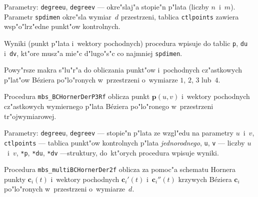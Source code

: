 Parametry: \texttt{degreeu}, \texttt{degreev} --- okre"slaj"a stopie"n
p"lata (liczby $n$~i~$m$). Parametr \texttt{spdimen} okre"sla wymiar~$d$
przestrzeni, tablica \texttt{ctlpoints} zawiera wsp"o"lrz"edne punkt"ow
kontrolnych.

Wyniki (punkt p"lata i~wektory pochodnych) procedura wpisuje do tablic
\texttt{p}, \texttt{du} i~\texttt{dv}, kt"ore musz"a mie"c d"lugo"s"c co
najmniej \texttt{spdimen}.

\vspace{\bigskipamount}
Powy"rsze makra s"lu"r"a do obliczania punkt"ow i~pochodnych cz"astkowych
p"lat"ow B\'{e}ziera po"lo"ronych w~przestrzeni o~wymiarze $1$, $2$, $3$
lub~$4$.

\vspace{\bigskipamount}
Procedura \texttt{mbs\_BCHornerDerP3Rf} oblicza punkt $\bm{p}(u,v)$
i~wektory pochodnych cz"astkowych wymiernego p"lata B\'{e}ziera po"lo"ronego
w~przestrzeni tr"ojwymiarowej.

Parametry: \texttt{degreeu}, \texttt{degreev} --- stopie"n p"lata ze
wzgl"edu na parametry $u$~i~$v$, \texttt{ctlpoints} --- tablica punkt"ow
kontrolnych p"lata \emph{jednorodnego}, \texttt{u}, \texttt{v} --- liczby
$u$~i~$v$, \texttt{*p}, \texttt{*du}, \texttt{*dv} ---struktury, do~kt"orych
procedura wpisuje wyniki.

\vspace{\bigskipamount}
\begin{sloppypar}
Procedura \texttt{mbs\_multiBCHornerDer2f} oblicza za pomoc"a schematu
Hornera punk\-ty $\bm{c}_i(t)$ i~wektory pochodnych $\bm{c}_i'(t)$
i~$\bm{c}_i''(t)$ krzywych
B\'{e}ziera $\bm{c}_i$ po"lo"ronych w~przestrzeni o~wymiarze~$d$.
\end{sloppypar}

